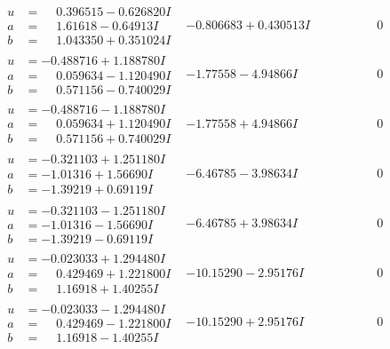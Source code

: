 \documentclass[1p]{elsarticle_modified}
\theoremstyle{definition}
\begin{document}
$$\begin{array}{c|c|c}
\begin{aligned}
u &= \phantom{-}0.396515 - 0.626820 I \\
a &= \phantom{-}1.61618 - 0.64913 I \\
b &= \phantom{-}1.043350 + 0.351024 I\end{aligned}
 & -0.806683 + 0.430513 I & \phantom{-0.000000 } 0 \\ \hline\begin{aligned}
u &= -0.488716 + 1.188780 I \\
a &= \phantom{-}0.059634 - 1.120490 I \\
b &= \phantom{-}0.571156 - 0.740029 I\end{aligned}
 & -1.77558 - 4.94866 I & \phantom{-0.000000 } 0 \\ \hline\begin{aligned}
u &= -0.488716 - 1.188780 I \\
a &= \phantom{-}0.059634 + 1.120490 I \\
b &= \phantom{-}0.571156 + 0.740029 I\end{aligned}
 & -1.77558 + 4.94866 I & \phantom{-0.000000 } 0 \\ \hline\begin{aligned}
u &= -0.321103 + 1.251180 I \\
a &= -1.01316 + 1.56690 I \\
b &= -1.39219 + 0.69119 I\end{aligned}
 & -6.46785 - 3.98634 I & \phantom{-0.000000 } 0 \\ \hline\begin{aligned}
u &= -0.321103 - 1.251180 I \\
a &= -1.01316 - 1.56690 I \\
b &= -1.39219 - 0.69119 I\end{aligned}
 & -6.46785 + 3.98634 I & \phantom{-0.000000 } 0 \\ \hline\begin{aligned}
u &= -0.023033 + 1.294480 I \\
a &= \phantom{-}0.429469 + 1.221800 I \\
b &= \phantom{-}1.16918 + 1.40255 I\end{aligned}
 & -10.15290 - 2.95176 I & \phantom{-0.000000 } 0 \\ \hline\begin{aligned}
u &= -0.023033 - 1.294480 I \\
a &= \phantom{-}0.429469 - 1.221800 I \\
b &= \phantom{-}1.16918 - 1.40255 I\end{aligned}
 & -10.15290 + 2.95176 I & \phantom{-0.000000 } 0\\

\end{array}$$
\end{document}
